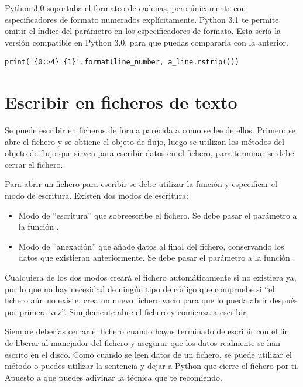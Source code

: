 Python 3.0 soportaba el formateo de cadenas, pero únicamente con especificadores de formato numerados explícitamente. Python 3.1 te permite omitir el índice del parámetro en los especificadores de formato. Esta sería la versión compatible en Python 3.0, para que puedas compararla con la anterior.

\noindent\begin{minipage}{\textwidth}
\begin{lstlisting}[mathescape=True]
print('{0:>4} {1}'.format(line_number, a_line.rstrip()))
\end{lstlisting}
\end{minipage}


\section{Escribir en ficheros de texto}

Se puede escribir en ficheros de forma parecida a como se lee de ellos. Primero se abre el fichero y se obtiene el objeto de flujo, luego se utilizan los métodos del objeto de flujo que sirven para escribir datos en el fichero, para terminar se debe cerrar el fichero.


Para abrir un fichero para escribir se debe utilizar la función  y especificar el modo de escritura. Existen dos modos de escritura:

\begin{itemize}

\item Modo de ``escritura'' que sobreescribe el fichero. Se debe pasar el parámetro  a la función .

\item Modo de ''anexación'' que añade datos al final del fichero, conservando los datos que existieran anteriormente. Se debe pasar el parámetro  a la función .

\end{itemize}

Cualquiera de los dos modos creará el fichero automáticamente si no existiera ya, por lo que no hay necesidad de ningún tipo de código que compruebe si ``el fichero aún no existe, crea un nuevo fichero vacío para que lo pueda abrir después por primera vez''. Simplemente abre el fichero y comienza a escribir.

Siempre deberías cerrar el fichero cuando hayas terminado de escribir con el fin de liberar al manejador del fichero y asegurar que los datos realmente se han escrito en el disco. Como cuando se leen datos de un fichero, se puede utilizar el método  o puedes utilizar la sentencia  y dejar a Python que cierre el fichero por ti. Apuesto a que puedes adivinar la técnica que te recomiendo.

